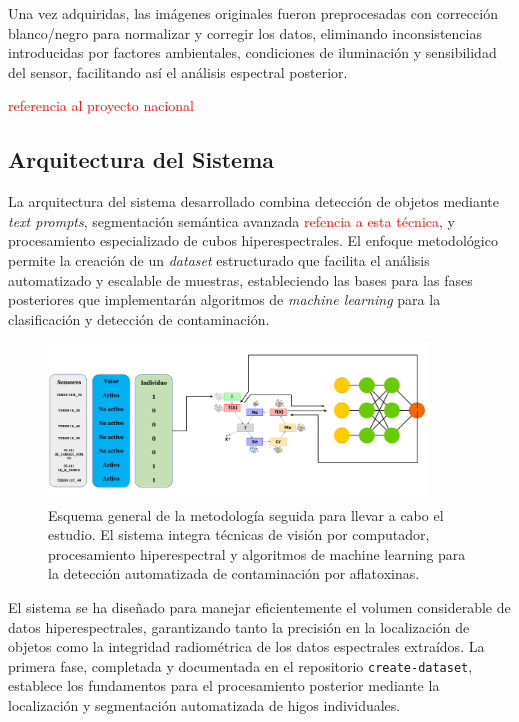 Una vez adquiridas, las imágenes originales fueron preprocesadas con corrección blanco/negro para normalizar y corregir los datos, eliminando inconsistencias introducidas por factores ambientales, condiciones de iluminación y sensibilidad del sensor, facilitando así el análisis espectral posterior.

\textcolor{red}{referencia al proyecto nacional}


\subsection{Arquitectura del Sistema}

La arquitectura del sistema desarrollado combina detección de objetos mediante \emph{text prompts}, segmentación semántica avanzada \textcolor{red}{refencia a esta técnica}, y procesamiento especializado de cubos hiperespectrales. El enfoque metodológico permite la creación de un \emph{dataset} estructurado que facilita el análisis automatizado y escalable de muestras, estableciendo las bases para las fases posteriores que implementarán algoritmos de \emph{machine learning} para la clasificación y detección de contaminación.

\begin{figure}[!ht]
\centering
\includegraphics[width=0.9\textwidth]{images/Sistema.png}
\caption{Esquema general de la metodología seguida para llevar a cabo el estudio. El sistema integra técnicas de visión por computador, procesamiento hiperespectral y algoritmos de machine learning para la detección automatizada de contaminación por aflatoxinas.}
\label{fig:sistema_general}
\end{figure}

El sistema se ha diseñado para manejar eficientemente el volumen considerable de datos hiperespectrales, garantizando tanto la precisión en la localización de objetos como la integridad radiométrica de los datos espectrales extraídos. La primera fase, completada y documentada en el repositorio \texttt{create-dataset}, establece los fundamentos para el procesamiento posterior mediante la localización y segmentación automatizada de higos individuales.

